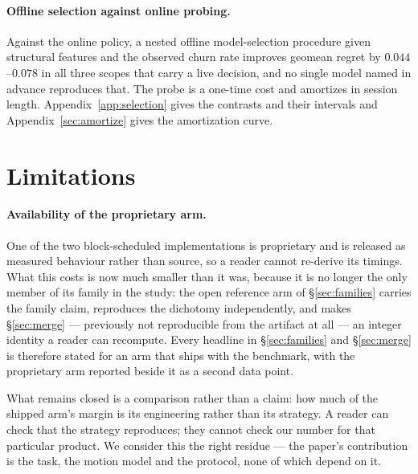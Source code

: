\documentclass{article}
\begin{document}
\paragraph{Offline selection against online probing.}
Against the online policy, a nested offline model-selection procedure given
structural features and the observed churn rate improves geomean regret by
$0.044$--$0.078$ in all three scopes that carry a live decision, and no single
model named in advance reproduces that. The probe is a one-time cost and
amortizes in session length. Appendix~\ref{app:selection} gives the contrasts
and their intervals and Appendix~\ref{sec:amortize} gives the amortization
curve.

\section{Limitations}
\label{sec:limits}

\paragraph{Availability of the proprietary arm.} One of the two
block-scheduled implementations is proprietary and is released as measured
behaviour rather than source, so a reader cannot re-derive its timings. What
this costs is now much smaller than it was, because it is no longer the only
member of its family in the study: the open reference arm of
\S\ref{sec:families} carries the family claim, reproduces the dichotomy
independently, and makes \S\ref{sec:merge} --- previously not reproducible from
the artifact at all --- an integer identity a reader can recompute. Every
headline in \S\ref{sec:families} and \S\ref{sec:merge} is therefore stated for
an arm that ships with the benchmark, with the proprietary arm reported beside
it as a second data point.

What remains closed is a comparison rather than a claim: how much of the
shipped arm's margin is its engineering rather than its strategy. A reader can
check that the strategy reproduces; they cannot check our number for that
particular product. We consider this the right residue --- the paper's
contribution is the task, the motion model and the protocol, none of which
depend on it.
\end{document}
